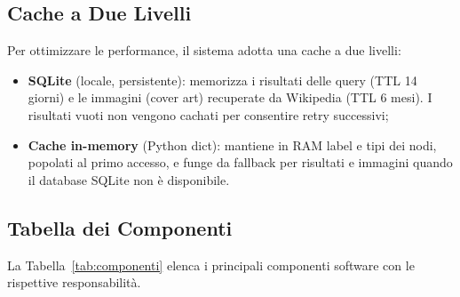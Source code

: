 \subsection{Cache a Due Livelli}

Per ottimizzare le performance, il sistema adotta una cache a due livelli:
\begin{itemize}[nosep]
  \item \textbf{SQLite} (locale, persistente): memorizza i risultati delle query (TTL 14 giorni) e le immagini (cover art) recuperate da Wikipedia (TTL 6 mesi). I risultati vuoti non vengono cachati per consentire retry successivi;
  \item \textbf{Cache in-memory} (Python dict): mantiene in RAM label e tipi dei nodi, popolati al primo accesso, e funge da fallback per risultati e immagini quando il database SQLite non \`e disponibile.
\end{itemize}

\subsection{Tabella dei Componenti}

La Tabella~\ref{tab:componenti} elenca i principali componenti software con le rispettive responsabilit\`a.

